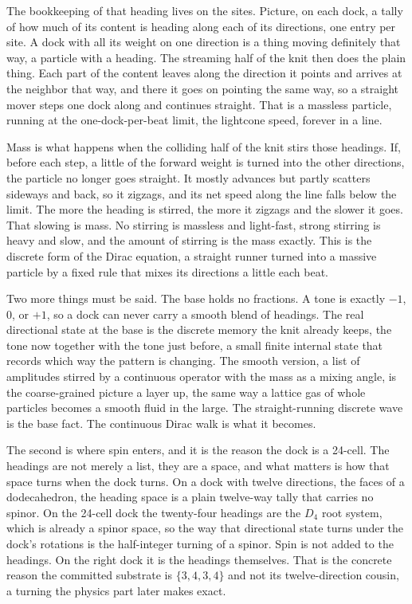 The bookkeeping of that heading lives on the sites. Picture, on each dock, a tally of how much of its content is heading along each of its directions, one entry per site. A dock with all its weight on one direction is a thing moving definitely that way, a particle with a heading. The streaming half of the knit then does the plain thing. Each part of the content leaves along the direction it points and arrives at the neighbor that way, and there it goes on pointing the same way, so a straight mover steps one dock along and continues straight. That is a massless particle, running at the one-dock-per-beat limit, the lightcone speed, forever in a line.

Mass is what happens when the colliding half of the knit stirs those headings. If, before each step, a little of the forward weight is turned into the other directions, the particle no longer goes straight. It mostly advances but partly scatters sideways and back, so it zigzags, and its net speed along the line falls below the limit. The more the heading is stirred, the more it zigzags and the slower it goes. That slowing is mass. No stirring is massless and light-fast, strong stirring is heavy and slow, and the amount of stirring is the mass exactly. This is the discrete form of the Dirac equation, a straight runner turned into a massive particle by a fixed rule that mixes its directions a little each beat.

Two more things must be said. The base holds no fractions. A tone is exactly $-1$, $0$, or $+1$, so a dock can never carry a smooth blend of headings. The real directional state at the base is the discrete memory the knit already keeps, the tone now together with the tone just before, a small finite internal state that records which way the pattern is changing. The smooth version, a list of amplitudes stirred by a continuous operator with the mass as a mixing angle, is the coarse-grained picture a layer up, the same way a lattice gas of whole particles becomes a smooth fluid in the large. The straight-running discrete wave is the base fact. The continuous Dirac walk is what it becomes.

The second is where spin enters, and it is the reason the dock is a 24-cell. The headings are not merely a list, they are a space, and what matters is how that space turns when the dock turns. On a dock with twelve directions, the faces of a dodecahedron, the heading space is a plain twelve-way tally that carries no spinor. On the 24-cell dock the twenty-four headings are the $D_4$ root system, which is already a spinor space, so the way that directional state turns under the dock's rotations is the half-integer turning of a spinor. Spin is not added to the headings. On the right dock it is the headings themselves. That is the concrete reason the committed substrate is $\{3,4,3,4\}$ and not its twelve-direction cousin, a turning the physics part later makes exact.
